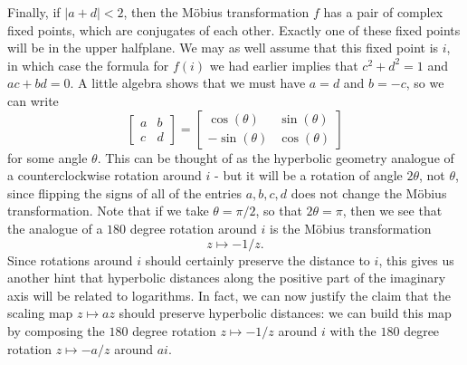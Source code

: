 Finally, if $|a+d| < 2$, then the M\"obius transformation $f$ has a pair of complex fixed points, which are conjugates of each other. Exactly one of these fixed points will be in the upper halfplane. We may as well assume that this fixed point is $i$, in which case the formula for $f(i)$ we had earlier implies that $c^2 + d^2 = 1$ and $ac + bd = 0$. A little algebra shows that we must have $a = d$ and $b = -c$, so we can write
\[
\begin{bmatrix}a & b\\ c & d\end{bmatrix} = \begin{bmatrix}\cos(\theta) & \sin(\theta)\\ -\sin(\theta) & \cos(\theta)\end{bmatrix}
\]
for some angle $\theta$. This can be thought of as the hyperbolic geometry analogue of a counterclockwise rotation around $i$ - but it will be a rotation of angle $2\theta$, not $\theta$, since flipping the signs of all of the entries $a,b,c,d$ does not change the M\"obius transformation. Note that if we take $\theta = \pi/2$, so that $2\theta = \pi$, then we see that the analogue of a $180$ degree rotation around $i$ is the M\"obius transformation
\[
z \mapsto -1/z.
\]
Since rotations around $i$ should certainly preserve the distance to $i$, this gives us another hint that hyperbolic distances along the positive part of the imaginary axis will be related to logarithms. In fact, we can now justify the claim that the scaling map $z \mapsto az$ should preserve hyperbolic distances: we can build this map by composing the $180$ degree rotation $z \mapsto -1/z$ around $i$ with the $180$ degree rotation $z \mapsto -a/z$ around $ai$.

